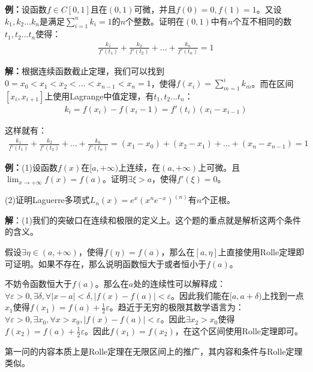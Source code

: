 \documentclass{ctexart}
\let\oldtextbf\textbf %
\renewcommand{\textbf}[1]{\textcolor{btex}{\oldtextbf{#1}}} %
\begin{document}
\textbf{例：}设函数$f\in C[0,1]$且在$(0,1)$可微，并且$f(0)=0,f(1)=1$。又设$k_1,k_2...k_n$是满足$\sum_{i=1}^n k_i=1$的$n$个整数。证明在$(0,1)$中有$n$个互不相同的数$t_1,t_2...t_n$使得：
\begin{align*}
    \frac{k_1}{f'(t_1)}+\frac{k_2}{f'(t_2)}+...+\frac{k_n}{f'(t_n)}=1
\end{align*}

\textbf{解：}根据连续函数截止定理，我们可以找到$0=x_0<x_1<x_2<...<x_{n-1}<x_n=1$，使得$f(x_i)=\sum_{m=1}^i k_m$。而在区间$[x_i,x_{i+1}]$上使用Lagrange中值定理，有$t_1,t_2...t_n$：
\begin{align*}
    k_i=f(x_i)-f(x_i-1)=f'(t_i)(x_i-x_{i-1})
\end{align*}

这样就有：
\begin{align*}
     \frac{k_1}{f'(t_1)}+\frac{k_2}{f'(t_2)}+...+\frac{k_n}{f'(t_n)}=(x_1-x_0)+(x_2-x_1)+...+(x_n-x_{n-1})=1
\end{align*}

\textbf{例：}(1)设函数$f(x)$在$[a,+\infty)$上连续，在$(a,+\infty)$上可微。且$\lim_{x\to+\infty}f(x)=f(a)$。证明$\exists \xi >a$，使得$f'(\xi)=0$。

(2)证明Laguerre多项式$L_n(x)=e^x(x^n e^{-x})^{(n)}$有$n$个正根。

\textbf{解}：(1)我们的突破口在连续和极限的定义上。这个题的重点就是解析这两个条件的含义。

假设$\exists \eta\in(a,+\infty)$，使得$f(\eta)=f(a)$，那么在$[a,\eta]$上直接使用Rolle定理即可证明。如果不存在，那么说明函数恒大于或者恒小于$f(a)$。

不妨令函数恒大于$f(a)$。那么在$a$处的连续性可以解释成：$\forall \varepsilon>0,\exists \delta,\forall |x-a|<\delta,|f(x)-f(a)|<\varepsilon$。因此我们能在$[a,a+\delta)$上找到一点$x_1$使得$f(x_1)=f(a)+\frac{1}{2}\varepsilon$。趋近于无穷的极限其数学语言为：$\forall \varepsilon>0,\exists x_0,\forall x>x_0,|f(x)-f(a)|<\varepsilon$。因此$\exists x_2>x_0$使得$f(x_2)=f(a)+\frac{1}{2}\varepsilon$。因此$f(x_1)=f(x_2)$，在这个区间使用Rolle定理即可。

\begin{tcolorbox}[
    colback=bac1,     %
    colframe=fra1,   %
    coltitle=white,             %
    coltext=tex1,
    title=一点补充,
    fonttitle=\bfseries,        %
arc=3mm,                     %
breakable
]
第一问的内容本质上是Rolle定理在无限区间上的推广，其内容和条件与Rolle定理类似。
\end{tcolorbox}
\end{document}
